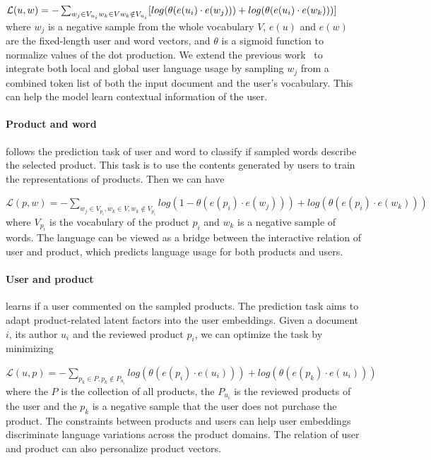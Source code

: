 $\mathcal{L}(u, w) = -\sum_{w_j \in V_{u_i} \\ w_k \in V \\ w_k \notin V_{u_i}}[log(\theta(e(u_i) \cdot e(w_j))) +  log(\theta(e(u_i) \cdot e(w_k)))]$
where $w_j$ is a negative sample from the whole vocabulary $V$, $e(u)$ and $e(w)$ are the fixed-length user and word vectors, and $\theta$ is a sigmoid function to normalize values of the dot production. We extend the previous work~\cite{amir2017quantifying} to integrate both local and global user language usage by sampling $w_j$ from a combined token list of both the input document and the user's vocabulary.
This can help the model learn contextual information of the user.


\paragraph{Product and word}
follows the prediction task of user and word to classify if sampled words describe the selected product. This task is to use the contents generated by users to train the representations of products. Then we can have 

$\mathcal{L}(p, w) = -\sum_{w_j \in V_{p_i}, w_k \in V, w_k \notin V_{p_i}}log(1 - \theta(e(p_i) \cdot e(w_j))) + log(\theta(e(p_i) \cdot e(w_k)))$
where $V_{p_i}$ is the vocabulary of the product $p_i$ and $w_k$ is a negative sample of words.
The language can be viewed as a bridge between the interactive relation of user and product, which predicts language usage for both products and users.


\paragraph{User and product}
learns if a user commented on the sampled products. The prediction task aims to adapt product-related latent factors into the user embeddings.
Given a document $i$, its author $u_i$ and the reviewed product $p_i$,
we can optimize the task by minimizing

$\mathcal{L}(u, p) = -\sum_{p_k \in P, p_k \notin P_{u_i}}log(\theta(e(p_i) \cdot e(u_i))) + log(\theta(e(p_k) \cdot e(u_i)))$
where the $P$ is the collection of all products, the $P_{u_i}$ is the reviewed products of the user and the $p_k$ is a negative sample that the user does not purchase the product.
The constraints between products and users can help user embeddings discriminate language variations across the product domains.
The relation of user and product can also personalize product vectors.

